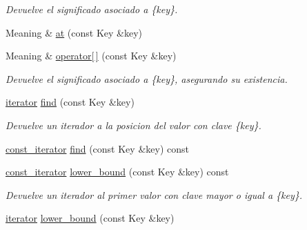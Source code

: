 \begin{Indent}
\begin{DoxyCompactItemize}
\begin{DoxyCompactList}\small\item\em Devuelve el significado asociado a \{key\}. \end{DoxyCompactList}\item 
Meaning \& \hyperlink{classaed2_1_1map_a6b21c09f59a83b6ee45432dcfa61f4a1}{at} (const Key \&key)
\item 
Meaning \& \hyperlink{classaed2_1_1map_a96f23896164ab47bee48c26b803f9801}{operator\mbox{[}$\,$\mbox{]}} (const Key \&key)
\begin{DoxyCompactList}\small\item\em Devuelve el significado asociado a \{key\}, asegurando su existencia. \end{DoxyCompactList}\item 
\hyperlink{classaed2_1_1map_1_1iterator}{iterator} \hyperlink{classaed2_1_1map_afd0fc1a8234888e61e0e615de7e245b8}{find} (const Key \&key)
\begin{DoxyCompactList}\small\item\em Devuelve un iterador a la posicion del valor con clave \{key\}. \end{DoxyCompactList}\item 
\hyperlink{classaed2_1_1map_1_1const__iterator}{const\+\_\+iterator} \hyperlink{classaed2_1_1map_adbf6f4ce01a16ca506e3c75fc2843882}{find} (const Key \&key) const
\item 
\hyperlink{classaed2_1_1map_1_1const__iterator}{const\+\_\+iterator} \hyperlink{classaed2_1_1map_a62075a47afdf89267c5462f88164af3d}{lower\+\_\+bound} (const Key \&key) const
\begin{DoxyCompactList}\small\item\em Devuelve un iterador al primer valor con clave mayor o igual a \{key\}. \end{DoxyCompactList}\item 
\hyperlink{classaed2_1_1map_1_1iterator}{iterator} \hyperlink{classaed2_1_1map_a07b3dd65557c59ee085e5f211269c6b3}{lower\+\_\+bound} (const Key \&key)
\end{DoxyCompactItemize}
\end{Indent}
